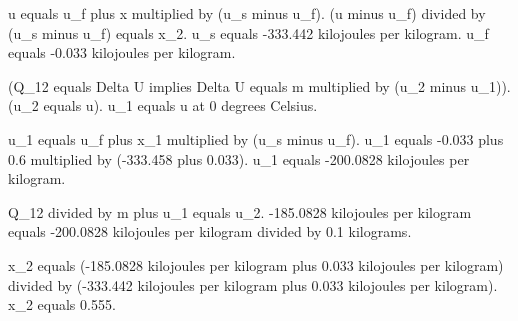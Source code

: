 u equals u_f plus x multiplied by (u_s minus u_f).  
(u minus u_f) divided by (u_s minus u_f) equals x_2.  
u_s equals -333.442 kilojoules per kilogram.  
u_f equals -0.033 kilojoules per kilogram.  

(Q_12 equals Delta U implies Delta U equals m multiplied by (u_2 minus u_1)).  
(u_2 equals u).  
u_1 equals u at 0 degrees Celsius.  

u_1 equals u_f plus x_1 multiplied by (u_s minus u_f).  
u_1 equals -0.033 plus 0.6 multiplied by (-333.458 plus 0.033).  
u_1 equals -200.0828 kilojoules per kilogram.  

Q_12 divided by m plus u_1 equals u_2.  
-185.0828 kilojoules per kilogram equals -200.0828 kilojoules per kilogram divided by 0.1 kilograms.  

x_2 equals (-185.0828 kilojoules per kilogram plus 0.033 kilojoules per kilogram) divided by (-333.442 kilojoules per kilogram plus 0.033 kilojoules per kilogram).  
x_2 equals 0.555.